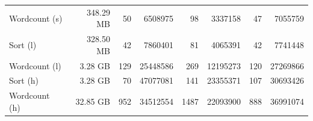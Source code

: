 \documentclass[review]{elsarticle}
\begin{document}
\begin{table}
\begin{tabular}[h]{ l r r r r r r r }
		Wordcount (s) & 348.29 MB & 50 & 6508975 & 98 & 3337158 & 47 & 7055759 \\
		Sort (l) & 328.50 MB & 42 & 7860401 & 81 & 4065391 & 42 & 7741448 \\
		Wordcount (l) & 3.28 GB & 129 & 25448586 & 269 & 12195273 & 120 & 27269866 \\
		Sort (h) & 3.28 GB & 70 & 47077081 & 141 & 23355371 & 107 & 30693426 \\
		Wordcount (h) & 32.85 GB & 952 & 34512554 & 1487 & 22093900 & 888 & 36991074 \\

\end{tabular}
\end{table}
\end{document}
